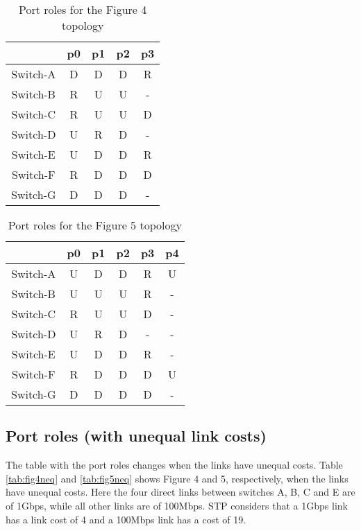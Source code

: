 \documentclass{article}
\begin{document}
\begin{table}[!h]
 \centering
    \begin{tabular}{|c|c|c|c|c|}
    \hline
         & p0 & p1 & p2 & p3  \\
    \hline
    Switch-A & D & D & D & R  \\ 
    Switch-B & R & U & U & - \\
    Switch-C & R & U & U & D  \\
    Switch-D & U & R & D & -  \\
    Switch-E & U & D & D & R  \\
    Switch-F & R & D & D & D  \\
    Switch-G & D & D & D & -  \\
    \hline
    \end{tabular}
    \caption{Port roles for the Figure 4 topology}
    \label{tab:fig4ports}
\end{table}


\begin{table}[!h]
 \centering
    \begin{tabular}{|c|c|c|c|c|c|}
    \hline
         & p0 & p1 & p2 & p3 & p4 \\
    \hline
    Switch-A & U & D & D & R & U \\
    Switch-B & U & U & U & R & - \\
    Switch-C & R & U & U & D & - \\
    Switch-D & U & R & D & - & - \\
    Switch-E & U & D & D & R & - \\
    Switch-F & R & D & D & D & U \\
    Switch-G & D & D & D & D & - \\
    \hline
    \end{tabular}
    \caption{Port roles for the Figure 5 topology}
    \label{tab:fig5ports}
\end{table}


\subsection{Port roles (with unequal link costs)}

The table with the port roles changes when the links have unequal costs. Table \ref{tab:fig4neq} and \ref{tab:fig5neq} shows Figure 4 and 5, respectively, when the links have unequal costs. Here the four direct links between switches A, B, C and E are of 1Gbps, while all other links are of 100Mbps. STP considers that a 1Gbps link has a link cost of 4 and a 100Mbps link has a cost of 19.
\end{document}
